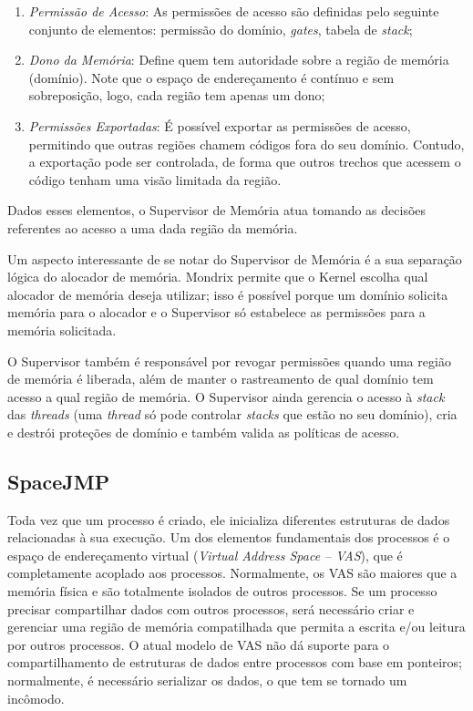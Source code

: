 \begin{enumerate}
	\item \emph{Permissão de Acesso}: As permissões de acesso são definidas pelo
				seguinte conjunto de elementos: permissão do domínio, \emph{gates},
        tabela de \emph{stack};
	\item \emph{Dono da Memória}: Define quem tem autoridade sobre a região de
				memória (domínio). Note que o espaço de endereçamento é contínuo e sem
				sobreposição, logo, cada região tem apenas um dono;
	\item \emph{Permissões Exportadas}: É possível exportar as permissões de
				acesso, permitindo que outras regiões chamem códigos
				fora do seu domínio. Contudo, a exportação pode ser controlada, de forma
				que outros trechos que acessem o código tenham uma visão limitada da
				região.
\end{enumerate}

Dados esses elementos, o Supervisor de Memória atua tomando as decisões
referentes ao acesso a uma dada região da memória.

Um aspecto interessante de se notar do Supervisor de Memória é a sua separação
lógica do alocador de memória. Mondrix permite que o Kernel escolha qual
alocador de memória deseja utilizar; isso é possível porque um domínio solicita
memória para o alocador e o Supervisor só estabelece as permissões para a
memória solicitada.

O Supervisor também é responsável por revogar permissões quando uma região de
memória é liberada, além de manter o rastreamento de qual domínio tem acesso a
qual região de memória. O Supervisor ainda gerencia o acesso à \emph{stack}
das \emph{threads} (uma \emph{thread} só pode controlar \emph{stacks} que estão
no seu domínio), cria e destrói proteções de domínio e também valida as
políticas de acesso.

\subsection{SpaceJMP}
\label{sec:mvas}

Toda vez que um processo é criado, ele inicializa diferentes estruturas de
dados relacionadas à sua execução. Um dos elementos fundamentais dos processos
é o espaço de endereçamento virtual (\emph{Virtual Address Space -- VAS}), que é
completamente acoplado aos processos. Normalmente, os VAS são maiores que a
memória física e são totalmente isolados de outros processos. Se um processo
precisar compartilhar dados com outros processos, será necessário criar e
gerenciar uma região de memória compatilhada que permita a escrita e/ou leitura
por outros processos. O atual modelo de VAS não dá suporte para
o compartilhamento de estruturas de dados entre processos com base em ponteiros;
normalmente, é necessário serializar os dados, o que tem se tornado um incômodo.

